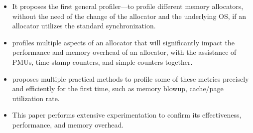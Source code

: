 \begin{itemize}
\item It proposes the first general profiler--\MP{}--to profile different memory allocators, without the need of the change of the allocator and the underlying OS, if an allocator utilizes the standard synchronization.  

\item \MP{} profiles multiple aspects of an allocator that will significantly impact the performance and memory overhead of an allocator, with the assistance of PMUs, time-stamp counters, and simple counters together. 

\item \MP{} proposes multiple practical methods to profile some of these metrics precisely and efficiently for the first time, such as memory blowup, cache/page utilization rate. 
 
\item This paper performs extensive experimentation to confirm its effectiveness, performance, and memory overhead.    

\end{itemize} 

